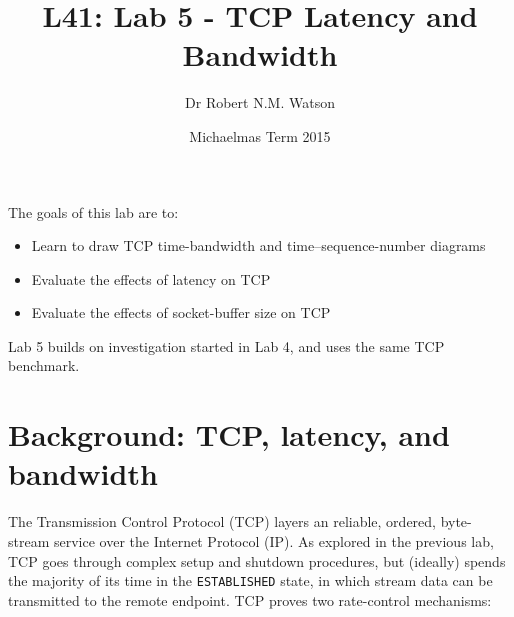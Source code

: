 \documentclass[a4paper,10pt]{article}
\begin{document}
\title{L41: Lab 5 - TCP Latency and Bandwidth}
\author{Dr Robert N.M. Watson}
\date{Michaelmas Term 2015}
\maketitle

\noindent
The goals of this lab are to:

\begin{itemize}
\item Learn to draw TCP time-bandwidth and time--sequence-number diagrams
\item Evaluate the effects of latency on TCP
\item Evaluate the effects of socket-buffer size on TCP
\end{itemize}

\noindent
Lab 5 builds on investigation started in Lab 4, and uses the same TCP
benchmark.

\section*{Background: TCP, latency, and bandwidth}

The Transmission Control Protocol (TCP) layers an reliable, ordered,
byte-stream service over the Internet Protocol (IP).
As explored in the previous lab, TCP goes through complex setup and shutdown
procedures, but (ideally) spends the majority of its time in the
\texttt{ESTABLISHED} state, in which stream data can be transmitted to the
remote endpoint.
TCP proves two rate-control mechanisms:
\end{document}
